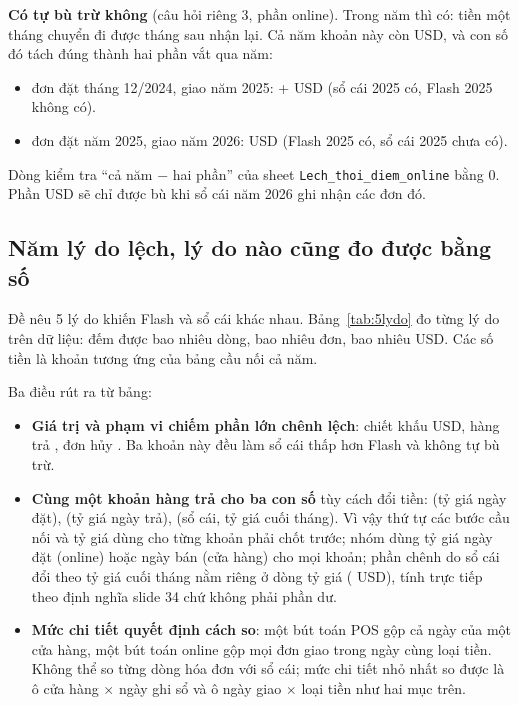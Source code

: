 \textbf{Có tự bù trừ không} (câu hỏi riêng 3, phần online). Trong năm thì có: tiền một tháng chuyển đi được tháng sau nhận lại. Cả năm khoản này còn \SoLechOnlineNam{} USD, và con số đó tách đúng thành hai phần vắt qua năm:
\begin{itemize}
  \item \SoDonVatDauKy{} đơn đặt tháng 12/2024, giao năm 2025: +\SoVatDauKy{} USD (sổ cái 2025 có, Flash 2025 không có).
  \item \SoDonVatCuoiKy{} đơn đặt năm 2025, giao năm 2026: \SoVatCuoiKy{} USD (Flash 2025 có, sổ cái 2025 chưa có).
\end{itemize}
Dòng kiểm tra ``cả năm $-$ hai phần'' của sheet \texttt{Lech\_thoi\_diem\_online} bằng 0. Phần \SoVatCuoiKy{} USD sẽ chỉ được bù khi sổ cái năm 2026 ghi nhận các đơn đó.

\subsection{Năm lý do lệch, lý do nào cũng đo được bằng số}

Đề nêu 5 lý do khiến Flash và sổ cái khác nhau. Bảng~\ref{tab:5lydo} đo từng lý do trên dữ liệu: đếm được bao nhiêu dòng, bao nhiêu đơn, bao nhiêu USD. Các số tiền là khoản tương ứng của bảng cầu nối cả năm.

\label{tab:5lydo}\nopagebreak[4]


Ba điều rút ra từ bảng:
\begin{itemize}
  \item \textbf{Giá trị và phạm vi chiếm phần lớn chênh lệch}: chiết khấu \SoChietKhau{} USD, hàng trả \SoTienTra{}, đơn hủy \SoTienHuy{}. Ba khoản này đều làm sổ cái thấp hơn Flash và không tự bù trừ.
  \item \textbf{Cùng một khoản hàng trả cho ba con số} tùy cách đổi tiền: \SoTienTra{} (tỷ giá ngày đặt), \SoTienTraNgayTra{} (tỷ giá ngày trả), \SoTienTraSoCai{} (sổ cái, tỷ giá cuối tháng). Vì vậy thứ tự các bước cầu nối và tỷ giá dùng cho từng khoản phải chốt trước; nhóm dùng tỷ giá ngày đặt (online) hoặc ngày bán (cửa hàng) cho mọi khoản; phần chênh do sổ cái đổi theo tỷ giá cuối tháng nằm riêng ở dòng tỷ giá (\SoTyGia{} USD), tính trực tiếp theo định nghĩa slide 34 chứ không phải phần dư.
  \item \textbf{Mức chi tiết quyết định cách so}: một bút toán POS gộp cả ngày của một cửa hàng, một bút toán online gộp mọi đơn giao trong ngày cùng loại tiền. Không thể so từng dòng hóa đơn với sổ cái; mức chi tiết nhỏ nhất so được là ô cửa hàng $\times$ ngày ghi sổ và ô ngày giao $\times$ loại tiền như hai mục trên.
\end{itemize}

